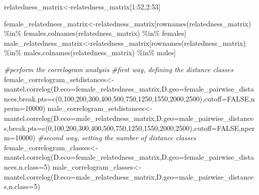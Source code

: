 \documentclass[
]{article}
\newenvironment{Shaded}{\begin{snugshade}}{\end{snugshade}}
\newcommand{\AttributeTok}[1]{\textcolor[rgb]{0.77,0.63,0.00}{#1}}
\newcommand{\CommentTok}[1]{\textcolor[rgb]{0.56,0.35,0.01}{\textit{#1}}}
\newcommand{\ConstantTok}[1]{\textcolor[rgb]{0.00,0.00,0.00}{#1}}
\newcommand{\DecValTok}[1]{\textcolor[rgb]{0.00,0.00,0.81}{#1}}
\newcommand{\FunctionTok}[1]{\textcolor[rgb]{0.00,0.00,0.00}{#1}}
\newcommand{\NormalTok}[1]{#1}
\newcommand{\OtherTok}[1]{\textcolor[rgb]{0.56,0.35,0.01}{#1}}
\newcommand{\SpecialCharTok}[1]{\textcolor[rgb]{0.00,0.00,0.00}{#1}}
\begin{document}
\begin{Shaded}
\begin{Highlighting}[]
\NormalTok{relatedness\_matrix}\OtherTok{\textless{}{-}}\NormalTok{relatedness\_matrix[}\DecValTok{1}\SpecialCharTok{:}\DecValTok{52}\NormalTok{,}\DecValTok{2}\SpecialCharTok{:}\DecValTok{53}\NormalTok{]}

\NormalTok{female\_relatedness\_matrix}\OtherTok{\textless{}{-}}\NormalTok{relatedness\_matrix[}\FunctionTok{rownames}\NormalTok{(relatedness\_matrix) }\SpecialCharTok{\%in\%}\NormalTok{ females,}\FunctionTok{colnames}\NormalTok{(relatedness\_matrix) }\SpecialCharTok{\%in\%}\NormalTok{ females]}
\NormalTok{male\_relatedness\_matrix}\OtherTok{\textless{}{-}}\NormalTok{relatedness\_matrix[}\FunctionTok{rownames}\NormalTok{(relatedness\_matrix) }\SpecialCharTok{\%in\%}\NormalTok{ males,}\FunctionTok{colnames}\NormalTok{(relatedness\_matrix) }\SpecialCharTok{\%in\%}\NormalTok{ males]}

\CommentTok{\#perform the correlogram analysis}
\CommentTok{\#first way, defining the distance classes}
\NormalTok{female\_correlogram\_setdistances}\OtherTok{\textless{}{-}}\FunctionTok{mantel.correlog}\NormalTok{(}\AttributeTok{D.eco=}\NormalTok{female\_relatedness\_matrix,}\AttributeTok{D.geo=}\NormalTok{female\_pairwise\_distances,}\AttributeTok{break.pts=}\FunctionTok{c}\NormalTok{(}\DecValTok{0}\NormalTok{,}\DecValTok{100}\NormalTok{,}\DecValTok{200}\NormalTok{,}\DecValTok{300}\NormalTok{,}\DecValTok{400}\NormalTok{,}\DecValTok{500}\NormalTok{,}\DecValTok{750}\NormalTok{,}\DecValTok{1250}\NormalTok{,}\DecValTok{1550}\NormalTok{,}\DecValTok{2000}\NormalTok{,}\DecValTok{2500}\NormalTok{),}\AttributeTok{cutoff=}\ConstantTok{FALSE}\NormalTok{,}\AttributeTok{nperm=}\DecValTok{10000}\NormalTok{)}
\NormalTok{male\_correlogram\_setdistances}\OtherTok{\textless{}{-}}\FunctionTok{mantel.correlog}\NormalTok{(}\AttributeTok{D.eco=}\NormalTok{male\_relatedness\_matrix,}\AttributeTok{D.geo=}\NormalTok{male\_pairwise\_distances,}\AttributeTok{break.pts=}\FunctionTok{c}\NormalTok{(}\DecValTok{0}\NormalTok{,}\DecValTok{100}\NormalTok{,}\DecValTok{200}\NormalTok{,}\DecValTok{300}\NormalTok{,}\DecValTok{400}\NormalTok{,}\DecValTok{500}\NormalTok{,}\DecValTok{750}\NormalTok{,}\DecValTok{1250}\NormalTok{,}\DecValTok{1550}\NormalTok{,}\DecValTok{2000}\NormalTok{,}\DecValTok{2500}\NormalTok{),}\AttributeTok{cutoff=}\ConstantTok{FALSE}\NormalTok{,}\AttributeTok{nperm=}\DecValTok{10000}\NormalTok{)}
\CommentTok{\#second way, setting the number of distance classes}
\NormalTok{female\_correlogram\_classes}\OtherTok{\textless{}{-}}\FunctionTok{mantel.correlog}\NormalTok{(}\AttributeTok{D.eco=}\NormalTok{female\_relatedness\_matrix,}\AttributeTok{D.geo=}\NormalTok{female\_pairwise\_distances,}\AttributeTok{n.class=}\DecValTok{5}\NormalTok{)}
\NormalTok{male\_correlogram\_classes}\OtherTok{\textless{}{-}}\FunctionTok{mantel.correlog}\NormalTok{(}\AttributeTok{D.eco=}\NormalTok{male\_relatedness\_matrix,}\AttributeTok{D.geo=}\NormalTok{male\_pairwise\_distances,}\AttributeTok{n.class=}\DecValTok{5}\NormalTok{)}


\end{Highlighting}
\end{Shaded}
\end{document}
